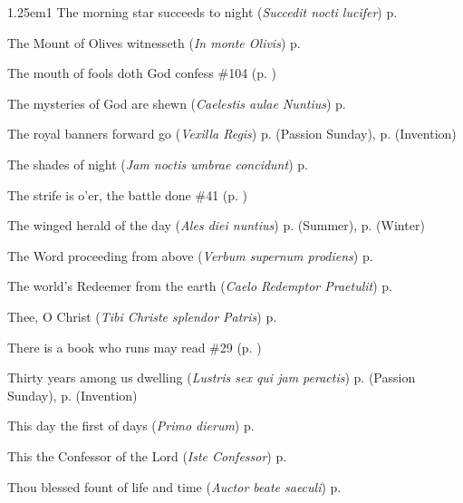 \begin{hangparas}{1.25em}{1}
The morning star succeeds to night (\textit{Succedit nocti lucifer}) \dotfill p. \pageref{AnneMattins}
\par\noindent
The Mount of Olives witnesseth (\textit{In monte Olivis}) \dotfill p. \pageref{HolyRosaryInvitatory}
\par\noindent
The mouth of fools doth God confess \dotfill \#104 (p. \pageref{Hymn104})
\par\noindent
The mysteries of God are shewn (\textit{Caelestis aulae Nuntius}) \dotfill p. \pageref{HolyRosaryIEvensong}
\par\noindent
The royal banners forward go (\textit{Vexilla Regis}) \dotfill p. \pageref{PassionSundayEvensong} (Passion Sunday), p. \pageref{InventionEvensong} (Invention)
\par\noindent
The shades of night (\textit{Jam noctis umbrae concidunt}) \dotfill p. \pageref{ScholasticaMattins}
\par\noindent
The strife is o'er, the battle done \dotfill \#41 (p. \pageref{Hymn41})
\par\noindent
The winged herald of the day (\textit{Ales diei nuntius}) \dotfill p. \pageref{TuesdayMattinsSummer} (Summer), p. \pageref{TuesdayMattinsWinter} (Winter)
\par\noindent
The Word proceeding from above (\textit{Verbum supernum prodiens}) \dotfill p. \pageref{CorpusChristiMattins}
\par\noindent
The world's Redeemer from the earth (\textit{Caelo Redemptor Praetulit}) \dotfill p. \pageref{MotherhoodInvitatory}
\par\noindent
Thee, O Christ (\textit{Tibi Christe splendor Patris}) \dotfill p. \pageref{MichaelEvensong}
\par\noindent
There is a book who runs may read \dotfill \#29 (p. \pageref{Hymn29})
\par\noindent
Thirty years among us dwelling (\textit{Lustris sex qui jam peractis}) \dotfill p. \pageref{PassionMattinsHymn} (Passion Sunday), p. \pageref{InventionMattins} (Invention)
\par\noindent
This day the first of days (\textit{Primo dierum}) \dotfill p. \pageref{SundayInvitatoryWinter}
\par\noindent
This the Confessor of the Lord (\textit{Iste Confessor}) \dotfill p. \pageref{ConfessorBishopEvensong}
\par\noindent
Thou blessed fount of life and time (\textit{Auctor beate saeculi}) \dotfill p. \pageref{CompassionEvensongHymn}
\par\noindent

\end{hangparas}
